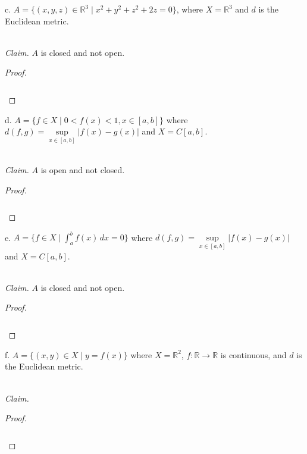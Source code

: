 \pagebreak

c.  $A = \{(x, y, z) \in \mathbb{R}^3 \mid x^2 + y^2 + z^2 + 2z = 0 \}$, where $X = \mathbb{R}^3$ and $d$ is the 
    Euclidean metric.

\ \\
\emph{Claim.} $A$ is closed and not open.

\begin{proof}\renewcommand{\qedsymbol}{}\ \\\\
    \begin{align*}
    \end{align*}
\end{proof}

\pagebreak

d.  $A = \{ f \in X \mid 0 < f(x) < 1, x \in [a, b] \}$ where $d(f, g) = \sup\limits_{x \in [a, b]}{|f(x) - g(x)|}$ and 
    $X = C[a, b]$.

\ \\
\emph{Claim.} $A$ is open and not closed. 

\begin{proof}\renewcommand{\qedsymbol}{}\ \\\\
    \begin{align*}
    \end{align*}
\end{proof}

\pagebreak

e.  $A = \{ f \in X \mid \int_a^b{f(x) \,dx} = 0 \}$ where $d(f, g) = \sup\limits_{x \in [a, b]}{|f(x) - g(x)|}$ and 
    $X = C[a, b]$.

\ \\
\emph{Claim.} $A$ is closed and not open.

\begin{proof}\renewcommand{\qedsymbol}{}\ \\\\
    \begin{align*}
    \end{align*}
\end{proof}

\pagebreak

f.  $A = \{ (x, y) \in X \mid y = f(x) \}$ where $X = \mathbb{R}^2$, $f:\mathbb{R} \to \mathbb{R}$ is continuous, and $d$ is 
    the Euclidean metric.

\ \\
\emph{Claim.} 

\begin{proof}\renewcommand{\qedsymbol}{}\ \\\\
    \begin{align*}
    \end{align*}
\end{proof}

\pagebreak
